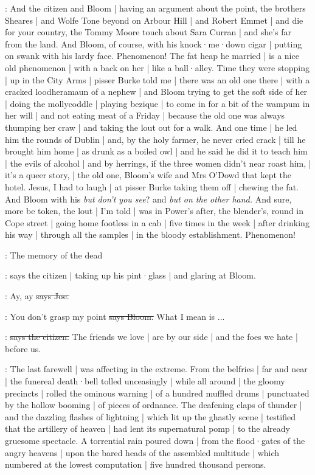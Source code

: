 \Nq:
And the citizen and Bloom |
having an argument about the point,
the brothers Sheares |
and Wolfe Tone beyond on Arbour Hill |
and Robert Emmet |
and die for your country,
the Tommy Moore touch about Sara Curran |
and she's far from the land.
And Bloom,
of course,
with his knock·me·down cigar |
putting on swank with his lardy face.
Phenomenon!
The fat heap he married |
is a nice old phenomenon |
with a back on her |
like a ball·alley.
Time they were stopping |
up in the City Arms |
pisser Burke told me |
there was an old one there |
with a cracked loodheramaun of a nephew |
and Bloom trying to get the soft side of her |
doing the mollycoddle |
playing bezique |
to come in for a bit of the wampum in her will |
and not eating meat of a Friday |
because the old one was always thumping her craw |
and taking the lout out for a walk.
And one time |
he led him the rounds of Dublin |
and,
by the holy farmer,
he never cried crack |
till he brought him home |
as drunk as a boiled owl |
and he said he did it to teach him |
the evils of alcohol |
and by herrings,
if the three women didn't near roast him, |
it's a queer story, |
the old one,
Bloom's wife
and Mrs O'Dowd that kept the hotel.
Jesus,
I had to laugh |
at pisser Burke taking them off |
chewing the fat.
And Bloom with his \emph{but don't you see}?
and \emph{but on the other hand.}
And sure,
more be token,
the lout |
I'm told |
was in Power's after,
the blender's,
round in Cope street |
going home footless in a cab |
five times in the week |
after drinking his way |
through all the samples |
in the bloody establishment.
Phenomenon!

\citizen:
The memory of the dead

\Nq:
says the citizen |
taking up his pint·glass |
and glaring at Bloom.%

\joe:
Ay,
ay
\sout{says Joe.}

\Bloom:
You don't grasp my point
\sout{says Bloom.}
What I mean is ...

\citizen:
\sout{says the citizen.}
The friends we love |
are by our side |
and the foes we hate |
before us.

:
The last farewell |
was affecting in the extreme.
From the belfries |
far and near |
the funereal death·bell tolled unceasingly |
while all around |
the gloomy precincts |
rolled the ominous warning |
of a hundred muffled drums |
punctuated by the hollow booming |
of pieces of ordnance.
The deafening claps of thunder |
and the dazzling flashes of lightning |
which lit up the ghastly scene |
testified that the artillery of heaven
 |
had lent its supernatural pomp |
to the already gruesome spectacle.
A torrential rain poured down |
from the flood·gates of the angry heavens |
upon the bared heads of the assembled multitude |
which numbered at the lowest computation |
five hundred thousand persons.

